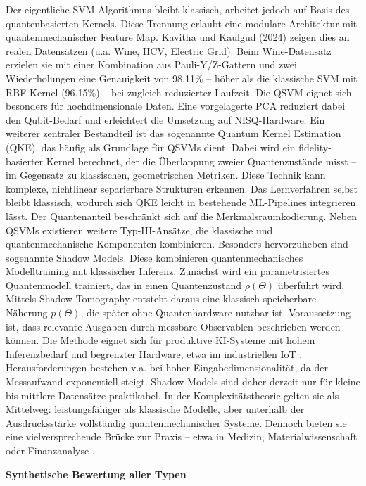 \noindent
Der eigentliche SVM-Algorithmus bleibt klassisch, arbeitet jedoch auf Basis des quantenbasierten Kernels. Diese Trennung erlaubt eine modulare Architektur mit quantenmechanischer Feature Map.
Kavitha und Kaulgud (2024) zeigen dies an realen Datensätzen (u.a. Wine, HCV, Electric Grid). Beim Wine-Datensatz erzielen sie mit einer Kombination aus Pauli-Y/Z-Gattern und zwei Wiederholungen eine Genauigkeit von 98{,}11\% – höher als die klassische SVM mit RBF-Kernel (96{,}15\%) – bei zugleich reduzierter Laufzeit.
Die QSVM eignet sich besonders für hochdimensionale Daten. Eine vorgelagerte PCA reduziert dabei den Qubit-Bedarf und erleichtert die Umsetzung auf NISQ-Hardware. 
Ein weiterer zentraler Bestandteil ist das sogenannte Quantum Kernel Estimation (QKE), das häufig als Grundlage für QSVMs dient. Dabei wird ein fidelity-basierter Kernel berechnet, der die Überlappung zweier Quantenzustände misst – im Gegensatz zu klassischen, geometrischen Metriken.
Diese Technik kann komplexe, nichtlinear separierbare Strukturen erkennen. Das Lernverfahren selbst bleibt klassisch, wodurch sich QKE leicht in bestehende ML-Pipelines integrieren lässt. Der Quantenanteil beschränkt sich auf die Merkmalsraumkodierung. 
Neben QSVMs existieren weitere Typ-III-Ansätze, die klassische und quantenmechanische Komponenten kombinieren. Besonders hervorzuheben sind sogenannte Shadow Models. Diese kombinieren quantenmechanisches Modelltraining mit klassischer Inferenz. Zunächst wird ein parametrisiertes Quantenmodell trainiert, das in einen Quantenzustand $\rho(\Theta)$ überführt wird. Mittels Shadow Tomography entsteht daraus eine klassisch speicherbare Näherung $p(\Theta)$, die später ohne Quantenhardware nutzbar ist. Voraussetzung ist, dass relevante Ausgaben durch messbare Observablen beschrieben werden können.
Die Methode eignet sich für produktive KI-Systeme mit hohem Inferenzbedarf und begrenzter Hardware, etwa im industriellen IoT \cite{jerbiShadowsQuantumMachine2024}.
Herausforderungen bestehen v.a. bei hoher Eingabedimensionalität, da der Messaufwand exponentiell steigt. Shadow Models sind daher derzeit nur für kleine bis mittlere Datensätze praktikabel.
In der Komplexitätstheorie gelten sie als Mittelweg: leistungsfähiger als klassische Modelle, aber unterhalb der Ausdrucksstärke vollständig quantenmechanischer Systeme. Dennoch bieten sie eine vielversprechende Brücke zur Praxis – etwa in Medizin, Materialwissenschaft oder Finanzanalyse
\cite{jerbiShadowsQuantumMachine2024}.


\vspace{1.5em}
\noindent\textbf{Synthetische Bewertung aller Typen}

